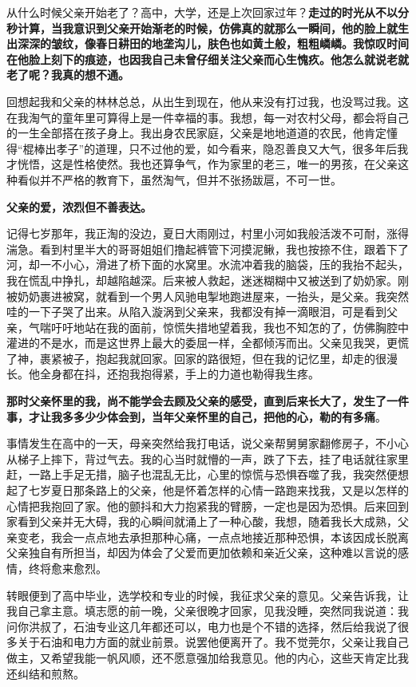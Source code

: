 \documentclass[UTF8,a4paper,8pt]{ctexart}
\begin{document}
 从什么时候父亲开始老了？高中，大学，还是上次回家过年？\textbf{走过的时光从不以分秒计算，当我意识到父亲开始渐老的时候，仿佛真的就那么一瞬间，他的脸上就生出深深的皱纹，像春日耕田的地垄沟儿，肤色也如黄土般，粗粗嶙嶙。我惊叹时间在他脸上刻下的痕迹，也因我自己未曾仔细关注父亲而心生愧疚。他怎么就说老就老了呢？我真的想不通。}
 
 回想起我和父亲的林林总总，从出生到现在，他从来没有打过我，也没骂过我。这在我淘气的童年里可算得上是一件幸福的事。我想，每一对农村父母，都会将自己的一生全部搭在孩子身上。我出身农民家庭，父亲是地地道道的农民，他肯定懂得“棍棒出孝子”的道理，只不过他的爱，如今看来，隐忍善良又大气，很多年后我才恍悟，这是性格使然。我也还算争气，作为家里的老三，唯一的男孩，在父亲这种看似并不严格的教育下，虽然淘气，但并不张扬跋扈，不可一世。
 
 \textbf{父亲的爱，浓烈但不善表达。}
 
 记得七岁那年，我正淘的没边，夏日大雨刚过，村里小河如我般活泼不可耐，涨得湍急。看到村里半大的哥哥姐姐们撸起裤管下河摸泥鳅，我也按捺不住，跟着下了河，却一不小心，滑进了桥下面的水窝里。水流冲着我的脑袋，压的我抬不起头，我在慌乱中挣扎，却越陷越深。后来被人救起，迷迷糊糊中又被送到了奶奶家。刚被奶奶裹进被窝，就看到一个男人风驰电掣地跑进屋来，一抬头，是父亲。我突然哇的一下子哭了出来。从陷入漩涡到父亲来，我都没有掉一滴眼泪，可是看到父亲，气喘吁吁地站在我的面前，惊慌失措地望着我，我也不知怎的了，仿佛胸腔中灌进的不是水，而是这世界上最大的委屈一样，全都倾泻而出。父亲见我哭，更慌了神，裹紧被子，抱起我就回家。回家的路很短，但在我的记忆里，却走的很漫长。他全身都在抖，还抱我抱得紧，手上的力道也勒得我生疼。 
 
 \textbf{那时父亲怀里的我，尚不能学会去顾及父亲的感受，直到后来长大了，发生了一件事，才让我多多少少体会到，当年父亲怀里的自己，把他的心，勒的有多痛}。
 
 事情发生在高中的一天，母亲突然给我打电话，说父亲帮舅舅家翻修房子，不小心从梯子上摔下，背过气去。我的心当时就懵的一声，跌了下去，挂了电话就往家里赶，一路上手足无措，脑子也混乱无比，心里的惊慌与恐惧吞噬了我，我突然便想起了七岁夏日那条路上的父亲，他是怀着怎样的心情一路跑来找我，又是以怎样的心情把我抱回了家。他的颤抖和大力抱紧我的臂膀，一定也是因为恐惧。后来回到家看到父亲并无大碍，我的心瞬间就涌上了一种心酸，我想，随着我长大成熟，父亲变老，我会一点点地去承担那种心痛，一点点地接近那种恐惧，本该因成长脱离父亲独自有所担当，却因为体会了父爱而更加依赖和亲近父亲，这种难以言说的感情，终将愈来愈烈。
 
 转眼便到了高中毕业，选学校和专业的时候，我征求父亲的意见。父亲告诉我，让我自己拿主意。填志愿的前一晚，父亲很晚才回家，见我没睡，突然同我说道：我问你洪叔了，石油专业这几年都还可以，电力也是个不错的选择，然后给我说了很多关于石油和电力方面的就业前景。说罢他便离开了。我不觉莞尔，父亲让我自己做主，又希望我能一帆风顺，还不愿意强加给我意见。他的内心，这些天肯定比我还纠结和煎熬。
 
\end{document}
